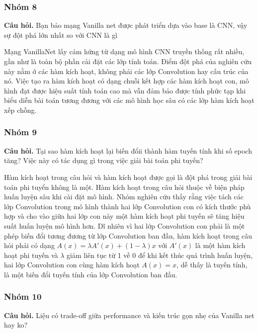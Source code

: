 \documentclass[a4paper,12pt]{report}
\begin{document}
\newpage
\subsubsection*{Nhóm 8}
\vspace*{-5mm}
\textbf{Câu hỏi.} Bạn bảo mạng Vanilla net được phát triển dựa vào base là CNN, vậy sự đột phá lớn nhất so với CNN là gì

Mạng VanillaNet lấy cảm hứng từ dạng mô hình CNN truyền thống rất nhiều, gần như là toàn bộ phần cài đặt các lớp tính toán. Điểm đột phá của nghiên cứu này nằm ở các hàm kích hoạt, không phải các lớp Convolution hay cấu trúc của nó. Việc tạo ra hàm kích hoạt có dạng chuỗi kết hợp các hàm kích hoạt con, mô hình đạt được hiệu suất tính toán cao mà vẫn đảm bảo được tính phức tạp khi biểu diễn bài toán tương đương với các mô hình học sâu có các lớp hàm kích hoạt xếp chồng.

\subsubsection*{Nhóm 9}
\vspace*{-5mm}
\textbf{Câu hỏi.} Tại sao hàm kích hoạt lại biến đổii thành hàm tuyến tính khi số epoch tăng? Việc này có tác dụng gì trong việc giải bài toán phi tuyến?

Hàm kích hoạt trong câu hỏi và hàm kích hoạt được gọi là đột phá trong giải bài toán phi tuyển không là một. Hàm kích hoạt trong câu hỏi thuộc về biện pháp huấn luyện sâu khi cài đặt mô hình. Nhóm nghiên cứu thấy rằng việc tách các lớp Convolution trong mô hình thành hai lớp Convolution con có kích thước phù hợp và cho vào giữa hai lớp con này một hàm kích hoạt phi tuyến sẽ tăng hiệu suất huấn luyện mô hình hơn. Dĩ nhiên vì hai lớp Convolution con phải là một phép biến đổi tương đương từ lớp Convolution ban đầu, hàm kích hoạt trong câu hỏi phải có dạng \(A(x) = \lambda A'(x) + (1-\lambda)x\) với \(A'(x)\) là một hàm kích hoạt phi tuyến và \(\lambda\) giảm liên tục từ 1 về 0 để khi kết thúc quá trình huấn luyện, hai lớp Convolution con cùng hàm kích hoạt \(A(x) = x\), dễ thấy là tuyến tính, là một biến đổi tuyến tính của lớp Convolution ban đầu.

\subsubsection*{Nhóm 10} 
\vspace*{-5mm}
\textbf{Câu hỏi.} Liệu có trade-off giữa performance và kiến trúc gọn nhẹ của Vanilla net hay ko?
\end{document}
